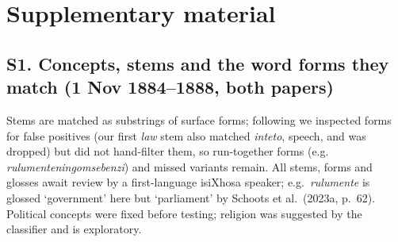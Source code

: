 \clearpage
\section*{Supplementary material}
\footnotesize
\subsection*{S1. Concepts, stems and the word forms they match (1 Nov 1884--1888, both papers)}
Stems are matched as substrings of surface forms; following \citet{schoots2023b} we inspected forms for false positives (our first \emph{law} stem also matched \emph{inteto}, speech, and was dropped) but did not hand-filter them, so run-together forms (e.g. \emph{rulumenteningomsebenzi}) and missed variants remain. All stems, forms and glosses await review by a first-language isiXhosa speaker; e.g.\ \emph{rulumente} is glossed `government' here but `parliament' by Schoots et al.\ (2023a, p.~62). Political concepts were fixed before testing; religion was suggested by the classifier and is exploratory.\\[2pt]
